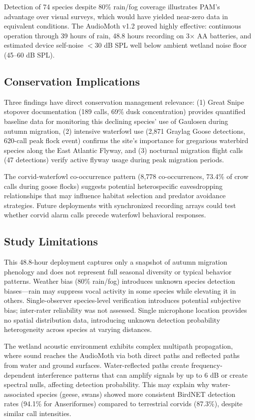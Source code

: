 \documentclass[english,twocolumn]{article}
\begin{document}
Detection of 74 species despite 80\% rain/fog coverage illustrates PAM's advantage over visual surveys, which would have yielded near-zero data in equivalent conditions. The AudioMoth v1.2 proved highly effective: continuous operation through 39 hours of rain, 48.8 hours recording on 3× AA batteries, and estimated device self-noise $<$30 dB SPL well below ambient wetland noise floor (45--60 dB SPL).

\subsection{Conservation Implications}

Three findings have direct conservation management relevance: (1) Great Snipe stopover documentation (189 calls, 69\% dusk concentration) provides quantified baseline data for monitoring this declining species' use of Gaulosen during autumn migration, (2) intensive waterfowl use (2,871 Graylag Goose detections, 620-call peak flock event) confirms the site's importance for gregarious waterbird species along the East Atlantic Flyway, and (3) nocturnal migration flight calls (47 detections) verify active flyway usage during peak migration periods.

The corvid-waterfowl co-occurrence pattern (8,778 co-occurrences, 73.4\% of crow calls during goose flocks) suggests potential heterospecific eavesdropping relationships \citep{Magrath2015} that may influence habitat selection and predator avoidance strategies. Future deployments with synchronized recording arrays could test whether corvid alarm calls precede waterfowl behavioral responses.

\subsection{Study Limitations}

This 48.8-hour deployment captures only a snapshot of autumn migration phenology and does not represent full seasonal diversity or typical behavior patterns. Weather bias (80\% rain/fog) introduces unknown species detection biases—rain may suppress vocal activity in some species while elevating it in others. Single-observer species-level verification introduces potential subjective bias; inter-rater reliability was not assessed. Single microphone location provides no spatial distribution data, introducing unknown detection probability heterogeneity across species at varying distances.

The wetland acoustic environment exhibits complex multipath propagation, where sound reaches the AudioMoth via both direct paths and reflected paths from water and ground surfaces. Water-reflected paths create frequency-dependent interference patterns that can amplify signals by up to 6 dB or create spectral nulls, affecting detection probability. This may explain why water-associated species (geese, swans) showed more consistent BirdNET detection rates (94.1\% for Anseriformes) compared to terrestrial corvids (87.3\%), despite similar call intensities.
\end{document}
